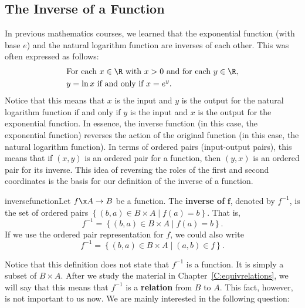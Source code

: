 \subsection*{The Inverse of a Function}
In previous mathematics courses, we learned that the exponential function (with base  $e$) and the natural logarithm function are inverses of each other.  This was often expressed as follows:
\begin{align*}
&\text{For each } x \in \R \text{ with } x > 0 \text{ and for each } y \in \R, \\
&y = \ln x \text{ if and only if } x = e^y.
\end{align*}
Notice that this means that $x$ is the input and $y$ is the output for the natural logarithm function if and only if $y$ is the input and $x$ is the output for the exponential function.  In essence, the inverse function (in this case, the exponential function) reverses the action of the original function (in this case, the natural logarithm function).  In terms of ordered pairs (input-output pairs), this means that if  $( {x, y} )$ is an ordered pair for a function, then  $( {y, x} )$ is an ordered pair for its inverse.  This idea of reversing the roles of the first and second coordinates is the basis for our definition of the inverse of a function.
%
%
%
\begin{defbox}{inversefunction}{Let  $f\x A \to B$  be a function.  The \textbf{inverse of}
%
%
  $\boldsymbol{f}$\!, denoted by  $f^{ - 1} $,
\label{sym:finverse} is the set of ordered pairs  
$\left\{ { {( {b, a} ) \in B \times A} \mid f( a ) = b} \right\}$.  That is,
\[
f^{ - 1}  = \left\{ { {( {b, a} ) \in B \times A} \mid f( a ) = b} \right\}\!.
\]
If we use the ordered pair representation for  $f$\!, we could also write
\[
f^{ - 1}  = \left\{ { {( {b, a} ) \in B \times A} \mid ( {a, b} ) \in f} \right\}\!.
\]
}
\end{defbox}
%
Notice that this definition does not state that  $f^{ - 1} $  is a function.  It is simply a subset of  $B \times A$.  After we study the material in Chapter~\ref{C:equivrelations}, we will say that this means that  $f^{ - 1}$ is a \textbf{relation} from  $B$  to  $A$.  This fact, however, is not important to us now.  We are mainly interested in the following question:

